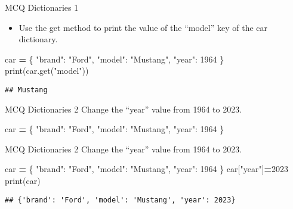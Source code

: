 \documentclass[
  8pt,
  ignorenonframetext,
]{beamer}
\newenvironment{Shaded}{\begin{snugshade}}{\end{snugshade}}
\newcommand{\BuiltInTok}[1]{#1}
\newcommand{\DecValTok}[1]{\textcolor[rgb]{0.00,0.00,0.81}{#1}}
\newcommand{\NormalTok}[1]{#1}
\newcommand{\OperatorTok}[1]{\textcolor[rgb]{0.81,0.36,0.00}{\textbf{#1}}}
\newcommand{\StringTok}[1]{\textcolor[rgb]{0.31,0.60,0.02}{#1}}
\providecommand{\tightlist}{%
  \setlength{\itemsep}{0pt}\setlength{\parskip}{0pt}}
\begin{document}
\begin{frame}[fragile]{MCQ Dictionaries 1}
\protect\hypertarget{mcq-dictionaries-1-1}{}
\begin{itemize}
\tightlist
\item
  Use the get method to print the value of the ``model'' key of the car
  dictionary.
\end{itemize}

\begin{Shaded}
\begin{Highlighting}[]
\NormalTok{car }\OperatorTok{=}\NormalTok{   \{}
  \StringTok{"brand"}\NormalTok{: }\StringTok{"Ford"}\NormalTok{,}
  \StringTok{"model"}\NormalTok{: }\StringTok{"Mustang"}\NormalTok{,}
  \StringTok{"year"}\NormalTok{: }\DecValTok{1964}
\NormalTok{\}}
\BuiltInTok{print}\NormalTok{(car.get(}\StringTok{"model"}\NormalTok{))}
\end{Highlighting}
\end{Shaded}

\begin{verbatim}
## Mustang
\end{verbatim}
\end{frame}

\begin{frame}[fragile]{MCQ Dictionaries 2}
\protect\hypertarget{mcq-dictionaries-2}{}
Change the ``year'' value from 1964 to 2023.

\begin{Shaded}
\begin{Highlighting}[]
\NormalTok{car }\OperatorTok{=}\NormalTok{   \{}
  \StringTok{"brand"}\NormalTok{: }\StringTok{"Ford"}\NormalTok{,}
  \StringTok{"model"}\NormalTok{: }\StringTok{"Mustang"}\NormalTok{,}
  \StringTok{"year"}\NormalTok{: }\DecValTok{1964}
\NormalTok{\}}
\end{Highlighting}
\end{Shaded}
\end{frame}

\begin{frame}[fragile]{MCQ Dictionaries 2}
\protect\hypertarget{mcq-dictionaries-2-1}{}
Change the ``year'' value from 1964 to 2023.

\begin{Shaded}
\begin{Highlighting}[]
\NormalTok{car }\OperatorTok{=}\NormalTok{   \{}
  \StringTok{"brand"}\NormalTok{: }\StringTok{"Ford"}\NormalTok{,}
  \StringTok{"model"}\NormalTok{: }\StringTok{"Mustang"}\NormalTok{,}
  \StringTok{"year"}\NormalTok{: }\DecValTok{1964}
\NormalTok{\}}
\NormalTok{car[}\StringTok{"year"}\NormalTok{]}\OperatorTok{=}\DecValTok{2023}
\BuiltInTok{print}\NormalTok{(car)}
\end{Highlighting}
\end{Shaded}

\begin{verbatim}
## {'brand': 'Ford', 'model': 'Mustang', 'year': 2023}
\end{verbatim}
\end{frame}
\end{document}
